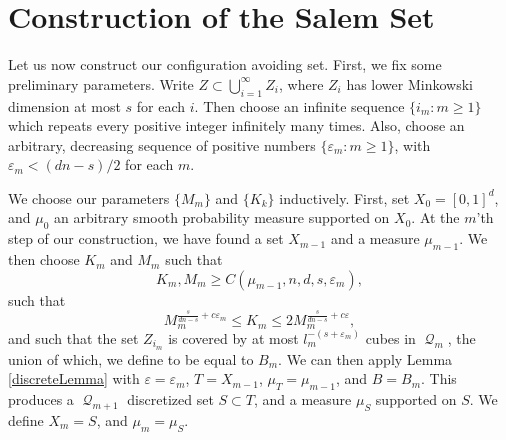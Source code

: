 \documentclass[12pt,reqno]{article}
\numberwithin{equation}{section}
\DeclareMathOperator{\DQ}{\mathcal{Q}}
\begin{document}
\section{Construction of the Salem Set}

Let us now construct our configuration avoiding set. First, we fix some preliminary parameters. Write $Z \subset \bigcup_{i = 1}^\infty Z_i$, where $Z_i$ has lower Minkowski dimension at most $s$ for each $i$. Then choose an infinite sequence $\{ i_m : m \geq 1 \}$ which repeats every positive integer infinitely many times. Also, choose an arbitrary, decreasing sequence of positive numbers $\{ \varepsilon_m : m \geq 1 \}$, with $\varepsilon_m < (dn - s)/2$ for each $m$.

We choose our parameters $\{ M_m \}$ and $\{ K_k \}$ inductively. First, set $X_0 = [0,1]^d$, and $\mu_0$ an arbitrary smooth probability measure supported on $X_0$. At the $m$'th step of our construction, we have found a set $X_{m-1}$ and a measure $\mu_{m-1}$. We then choose $K_m$ and $M_m$ such that
%
\[ K_m, M_m \geq C(\mu_{m-1}, n, d, s, \varepsilon_m), \]
%
such that
%
\[ M_m^{\frac{s}{dn-s} + c\varepsilon_m} \leq K_m \leq 2 M_m^{\frac{s}{dn-s} + c\varepsilon}, \]
%
and such that the set $Z_{i_m}$ is covered by at most $l_m^{-(s + \varepsilon_m)}$ cubes in $\DQ_m$, the union of which, we define to be equal to $B_m$. We can then apply Lemma \ref{discreteLemma} with $\varepsilon = \varepsilon_m$, $T = X_{m-1}$, $\mu_T = \mu_{m-1}$, and $B = B_m$. This produces a $\DQ_{m+1}$ discretized set $S \subset T$, and a measure $\mu_S$ supported on $S$. We define $X_m = S$, and $\mu_m = \mu_S$.
\end{document}
